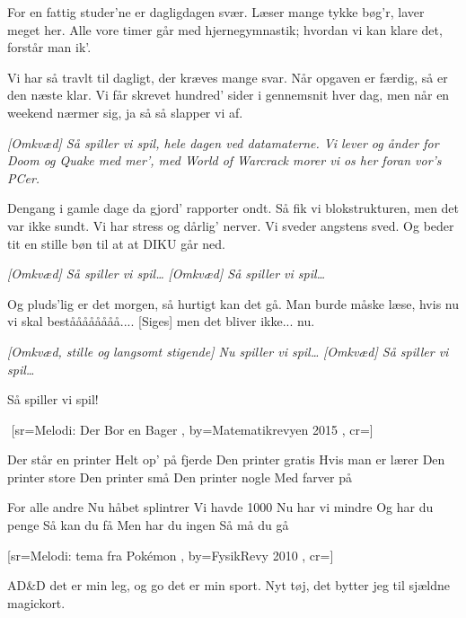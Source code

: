 \documentclass[pdftex,12pt]{article}
\begin{document}
\begin{songs}{}
\beginverse
For en fattig studer'ne
er dagligdagen svær.
Læser mange tykke bøg'r,
laver meget her.
Alle vore timer går med hjernegymnastik;
hvordan vi kan klare det, forstår man ik'.

\endverse
\beginverse
Vi har så travlt til dagligt,
der kræves mange svar.
Når opgaven er færdig,
så er den næste klar.
Vi får skrevet hundred' sider
i gennemsnit hver dag,
men når en weekend nærmer sig, ja så
så slapper vi af.

\endverse
\beginverse
\emph{[Omkvæd] Så spiller vi spil, hele dagen
ved datamaterne.
Vi lever og ånder
for Doom og Quake med mer',
med World of Warcrack morer vi os
her foran vor's PCer.}

\endverse
\beginverse
Dengang i gamle dage
da gjord' rapporter ondt.
Så fik vi blokstrukturen,
men det var ikke sundt.
Vi har stress og dårlig' nerver.
Vi sveder angstens sved.
Og beder tit en stille bøn til at
at DIKU går ned.

\endverse
\beginverse
\emph{[Omkvæd] Så spiller vi spil\ldots}
\emph{[Omkvæd] Så spiller vi spil\ldots}

\endverse
\beginverse
Og pluds'lig er det morgen,
så hurtigt kan det gå.
Man burde måske læse,
hvis nu vi skal beståååååååå....
{}[Siges] men det bliver ikke... nu.

\endverse
\beginverse
\emph{[Omkvæd, stille og langsomt stigende] Nu spiller vi spil\ldots}
\emph{[Omkvæd] Så spiller vi spil\ldots}

\endverse
\beginverse
Så spiller vi spil!

\endverse
\endsong



﻿
[sr={Melodi: Der Bor en Bager}
,
by={Matematikrevyen 2015}
,
cr={}]\hypertarget{Der står en printer}{}
\label{song59}

\beginverse
Der står en printer
Helt op' på fjerde
Den printer gratis
Hvis man er lærer
Den printer store
Den printer små
Den printer nogle
Med farver på
\endverse

\beginverse
For alle andre
Nu håbet splintrer
Vi havde 1000
Nu har vi mindre
Og har du penge
Så kan du få
Men har du ingen
Så må du gå
\endverse


\endsong



﻿[sr={Melodi: tema fra Pokémon}
,
by={FysikRevy 2010}
,
cr={}]\hypertarget{Jeg' en nørd}{}
\label{song60}

\beginverse
AD\&D det er min leg,
og go det er min sport.
Nyt tøj, det bytter jeg
til sjældne magickort.


\end{songs}
\end{document}
